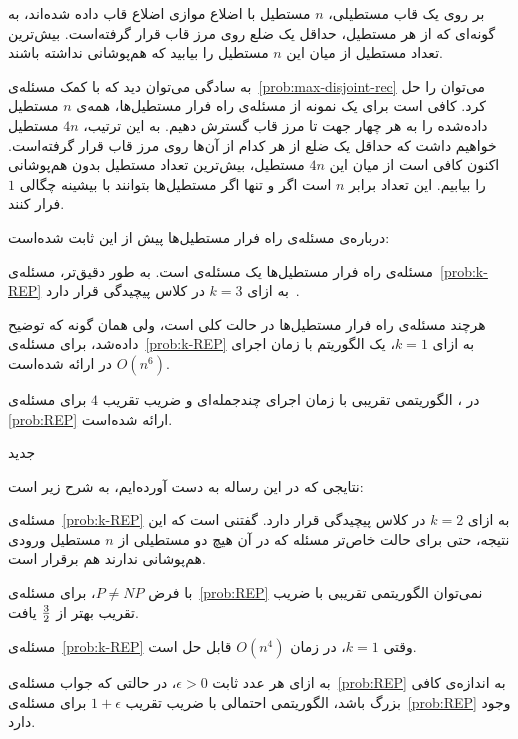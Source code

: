 بر روی یک قاب مستطیلی، $n$ مستطیل با اضلاع موازی اضلاع قاب داده شده‌اند، به گونه‌ای که از هر مستطیل، حد‌اقل یک ضلع روی مرز قاب قرار گرفته‌است. بیش‌ترین تعداد مستطیل از میان این $n$ مستطیل را بیابید که هم‌پوشانی نداشته باشند.


به سادگی می‌توان دید که با کمک مسئله‌ی~\ref{prob:max-disjoint-rec} می‌توان  را حل کرد. کافی است برای یک نمونه از مسئله‌ی راه فرار مستطیل‌ها، همه‌ی $n$ مستطیل داده‌شده را به هر چهار جهت تا مرز قاب گسترش دهیم. به این ترتیب، $4n$ مستطیل خواهیم داشت که حد‌اقل یک ضلع از هر کدام از آن‌ها روی مرز قاب قرار گرفته‌است. اکنون کافی است از میان این $4n$ مستطیل، بیش‌ترین تعداد مستطیل بدون هم‌پوشانی را بیابیم. این تعداد برابر $n$ است اگر و تنها اگر مستطیل‌ها بتوانند با بیشینه چگالی $1$ فرار کنند.


درباره‌ی مسئله‌ی راه فرار مستطیل‌ها پیش از این ثابت شده‌است:


 مسئله‌ی راه فرار مستطیل‌ها یک مسئله‌ی  است. به طور دقیق‌تر، مسئله‌ی~\ref{prob:k-REP} به ازای $k = 3$ در کلاس پیچیدگی  قرار دارد~\cite{REP}.

 هر‌چند مسئله‌ی راه فرار مستطیل‌ها در حالت کلی  است، ولی همان گونه که توضیح داده‌شد، برای مسئله‌ی~\ref{prob:k-REP} به ازای $k = 1$، یک الگوریتم با زمان اجرای $O(n ^ 6)$ در \cite{BoundaryRec} ارائه شده‌است.

 در \cite{REP}، الگوریتمی تقریبی با زمان اجرای چند‌جمله‌ای و ضریب تقریب $4$ برای مسئله‌ی \ref{prob:REP} ارائه شده‌است.


‌جدید


نتایجی که در این رساله به دست آورده‌ایم، به شرح زیر است:


 مسئله‌ی~\ref{prob:k-REP} به ازای $k = 2$ در کلاس پیچیدگی  قرار دارد. گفتنی است که این نتیجه، حتی برای حالت خاص‌تر مسئله که در آن هیچ دو مستطیلی از $n$ مستطیل ورودی هم‌پوشانی ندارند هم برقرار است.

 با فرض $P \neq NP$، برای مسئله‌ی~\ref{prob:REP} نمی‌توان الگوریتمی تقریبی با ضریب تقریب بهتر از ${3} \over {2}$ یافت.

 مسئله‌ی~\ref{prob:k-REP} وقتی $k = 1$، در زمان $O(n ^ 4)$ قابل حل است.

 به ازای هر عدد ثابت $\epsilon > 0$، در حالتی که جواب مسئله‌ی~\ref{prob:REP} به اندازه‌ی کافی بزرگ باشد، الگوریتمی احتمالی با ضریب تقریب $1 + \epsilon$ برای مسئله‌ی~\ref{prob:REP} وجود دارد.

